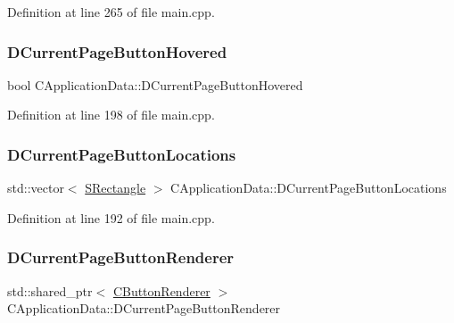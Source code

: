 Definition at line 265 of file main.\+cpp.

\hypertarget{classCApplicationData_a96b3a9b5c9965540007dff3fa85587fa}{}\label{classCApplicationData_a96b3a9b5c9965540007dff3fa85587fa} 
\subsubsection{\texorpdfstring{D\+Current\+Page\+Button\+Hovered}{DCurrentPageButtonHovered}}
{\footnotesize\ttfamily bool C\+Application\+Data\+::\+D\+Current\+Page\+Button\+Hovered\hspace{0.3cm}{\ttfamily [protected]}}



Definition at line 198 of file main.\+cpp.

\hypertarget{classCApplicationData_a3615df8e23cea3ce17f11cf61340a7b4}{}\label{classCApplicationData_a3615df8e23cea3ce17f11cf61340a7b4} 
\subsubsection{\texorpdfstring{D\+Current\+Page\+Button\+Locations}{DCurrentPageButtonLocations}}
{\footnotesize\ttfamily std\+::vector$<$ \hyperlink{structSRectangle}{S\+Rectangle} $>$ C\+Application\+Data\+::\+D\+Current\+Page\+Button\+Locations\hspace{0.3cm}{\ttfamily [protected]}}



Definition at line 192 of file main.\+cpp.

\hypertarget{classCApplicationData_abfe1743f2634b069ccc811db4a8733a8}{}\label{classCApplicationData_abfe1743f2634b069ccc811db4a8733a8} 
\subsubsection{\texorpdfstring{D\+Current\+Page\+Button\+Renderer}{DCurrentPageButtonRenderer}}
{\footnotesize\ttfamily std\+::shared\+\_\+ptr$<$ \hyperlink{classCButtonRenderer}{C\+Button\+Renderer} $>$ C\+Application\+Data\+::\+D\+Current\+Page\+Button\+Renderer\hspace{0.3cm}{\ttfamily [protected]}}



